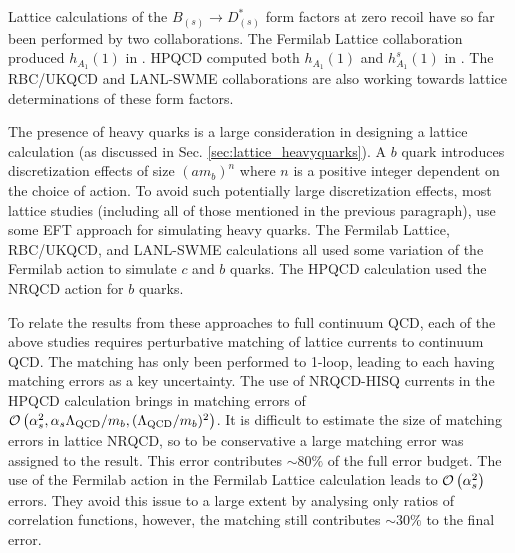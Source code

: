 Lattice calculations of the $B_{(s)} \to D_{(s)}^*$ form factors at zero recoil have so far been performed by two collaborations. The Fermilab Lattice collaboration produced $h_{A_1}(1)$ in \cite{Bailey:2014tva}. HPQCD computed both $h_{A_1}(1)$ and $h_{A_1}^s(1)$ in \cite{Harrison:2017fmw}. The RBC/UKQCD \cite{Flynn:2016vej} and LANL-SWME \cite{Bailey:2017xjk} collaborations are also working towards lattice determinations of these form factors.


The presence of heavy quarks is a large consideration in designing a lattice calculation (as discussed in Sec. \ref{sec:lattice_heavyquarks}). A $b$ quark introduces discretization effects of size $(am_b)^n$ where $n$ is a positive integer dependent on the choice of action. To avoid such potentially large discretization effects, most lattice studies (including all of those mentioned in the previous paragraph), use some EFT approach for simulating heavy quarks. The Fermilab Lattice, RBC/UKQCD, and LANL-SWME calculations all used some variation of the Fermilab action \cite{Wilson:1977xx,SHEIKHOLESLAMI1985572,ElKhadra:1996mp} to simulate $c$ and $b$ quarks. The HPQCD calculation used the NRQCD action \cite{Lepage:1992tx} for $b$ quarks. 

To relate the results from these approaches to full continuum QCD, each of the above studies requires perturbative matching of lattice currents to continuum QCD. The matching has only been performed to 1-loop, leading to each having matching errors as a key uncertainty. The use of NRQCD-HISQ currents in the HPQCD calculation brings in matching errors of $\mathcal{O}\left( \alpha_s^2,\alpha_s \Lambda_{\text{QCD}} / m_b, (\Lambda_{\text{QCD}} / m_b )^2 \right)$. It is difficult to estimate the size of matching errors in lattice NRQCD, so to be conservative a large matching error was assigned to the result. This error contributes $\sim 80\%$ of the full error budget. The use of the Fermilab action in the Fermilab Lattice calculation leads to $\mathcal{O}\left( \alpha_s^2 \right)$ errors. They avoid this issue to a large extent by analysing only ratios of correlation functions, however, the matching still contributes $\sim 30\%$ to the final error. %

